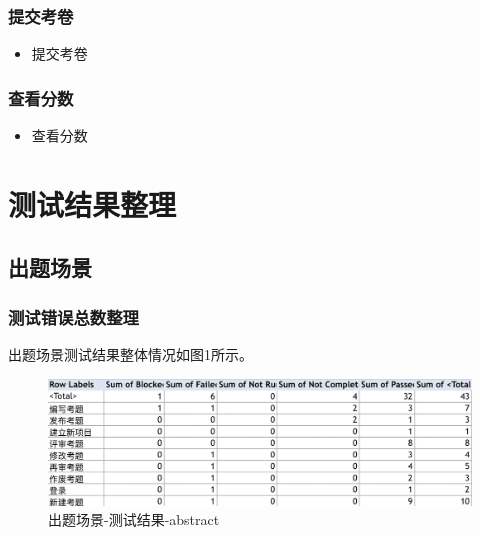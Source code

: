 \documentclass[hyperref, a4paper]{ctexart}
\providecommand{\tightlist}{%
  \setlength{\itemsep}{0pt}\setlength{\parskip}{0pt}}
\begin{document}
\hypertarget{ux63d0ux4ea4ux8003ux5377-1}{%
\subsubsection{提交考卷}\label{ux63d0ux4ea4ux8003ux5377-1}}

\begin{itemize}
\tightlist
\item
  提交考卷
\end{itemize}

\hypertarget{ux67e5ux770bux5206ux6570-1}{%
\subsubsection{查看分数}\label{ux67e5ux770bux5206ux6570-1}}

\begin{itemize}
\tightlist
\item
  查看分数
\end{itemize}

\hypertarget{ux6d4bux8bd5ux7ed3ux679cux6574ux7406}{%
\section{测试结果整理}\label{ux6d4bux8bd5ux7ed3ux679cux6574ux7406}}

\hypertarget{ux51faux9898ux573aux666f-1}{%
\subsection{出题场景}\label{ux51faux9898ux573aux666f-1}}

\hypertarget{ux6d4bux8bd5ux9519ux8befux603bux6570ux6574ux7406}{%
\subsubsection{测试错误总数整理}\label{ux6d4bux8bd5ux9519ux8befux603bux6570ux6574ux7406}}

出题场景测试结果整体情况如图1所示。

\begin{figure}
\centering
\includegraphics{screenshoots/PivotTable_abstract.png}
\caption{出题场景-测试结果-abstract}
\end{figure}
\end{document}
